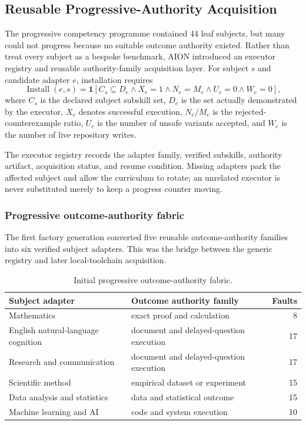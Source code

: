 \subsection{Reusable Progressive-Authority Acquisition}
\label{subsec:aion-progressive-authority-acquisition}

The progressive competency programme contained 44 leaf subjects, but many
could not progress because no suitable outcome authority existed.  Rather than
treat every subject as a bespoke benchmark, AION introduced an executor
registry and reusable authority-family acquisition layer.  For subject $s$ and
candidate adapter $e$, installation requires
\begin{equation}
\operatorname{Install}(e,s)=
\mathbf{1}\!\left[
  C_s\subseteq D_e
  \land X_e=1
  \land N_e=M_e
  \land U_e=0
  \land W_e=0
\right],
\label{eq:aion-adapter-install-gate}
\end{equation}
where $C_s$ is the declared subject subskill set, $D_e$ is the set actually
demonstrated by the executor, $X_e$ denotes successful execution, $N_e/M_e$ is
the rejected-counterexample ratio, $U_e$ is the number of unsafe variants
accepted, and $W_e$ is the number of live repository writes.

The executor registry records the adapter family, verified subskills, authority
artifact, acquisition status, and resume condition.  Missing adapters park the
affected subject and allow the curriculum to rotate; an unrelated executor is
never substituted merely to keep a progress counter moving.

\subsubsection{Progressive outcome-authority fabric}

The first factory generation converted five reusable outcome-authority families
into six verified subject adapters.  This was the bridge between the generic
registry and later local-toolchain acquisition.

\begin{table}[htbp]
\centering
\caption{Initial progressive outcome-authority fabric.}
\label{tab:aion-outcome-authority-fabric}
\begin{tabularx}{\textwidth}{@{}>{\raggedright\arraybackslash}p{4.0cm}>{\raggedright\arraybackslash}Xr@{}}
\toprule
Subject adapter & Outcome authority family & Faults \\
\midrule
Mathematics & exact proof and calculation & 8 \\
English natural-language cognition & document and delayed-question execution & 17 \\
Research and communication & document and delayed-question execution & 17 \\
Scientific method & empirical dataset or experiment & 15 \\
Data analysis and statistics & data and statistical outcome & 15 \\
Machine learning and AI & code and system execution & 10 \\
\bottomrule
\end{tabularx}
\end{table}

